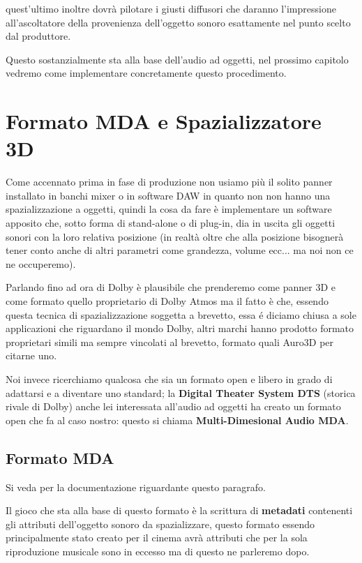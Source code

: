 \documentclass[12pt,a4paper]{report}
\begin{document}
quest'ultimo inoltre dovrà  pilotare i giusti diffusori che daranno l'impressione all'ascoltatore della provenienza dell'oggetto sonoro esattamente nel punto scelto dal produttore.

Questo sostanzialmente sta alla base dell'audio ad oggetti, nel prossimo capitolo vedremo come implementare concretamente questo procedimento.

\chapter{Formato MDA e Spazializzatore 3D}\label{dolby}

Come accennato prima in fase di produzione  non usiamo più il solito panner installato in banchi mixer o in software DAW in quanto non non hanno una spazializzazione a oggetti, quindi la cosa da fare è implementare un software apposito che, sotto forma di stand-alone o di plug-in, dia in uscita gli oggetti sonori con la loro relativa posizione (in realtà oltre che alla posizione bisognerà tener conto anche di altri parametri come grandezza, volume ecc... ma noi non ce ne occuperemo).

Parlando fino ad ora di Dolby è plausibile che prenderemo come panner 3D e come formato quello proprietario di Dolby Atmos ma il fatto è che, essendo questa tecnica di spazializzazione soggetta a brevetto, essa é diciamo chiusa a sole applicazioni che riguardano il mondo Dolby, altri marchi hanno prodotto formato proprietari simili ma sempre vincolati al brevetto, formato quali Auro3D per citarne uno.

Noi invece ricerchiamo qualcosa che sia un formato open e libero in grado di adattarsi e a diventare uno standard; la \textbf{Digital Theater System DTS} (storica rivale di Dolby) anche lei interessata all'audio ad oggetti ha creato un formato open che fa al caso nostro: questo si chiama \textbf{Multi-Dimesional Audio MDA}.

\section{Formato MDA}

Si veda \cite{mda} per la documentazione riguardante questo paragrafo.

Il gioco che sta alla base di questo formato è la scrittura di \textbf{metadati} contenenti gli attributi dell'oggetto sonoro da spazializzare, questo formato essendo principalmente stato creato per il cinema avrà attributi che per la sola riproduzione musicale sono in eccesso ma di questo ne parleremo dopo.
\end{document}
